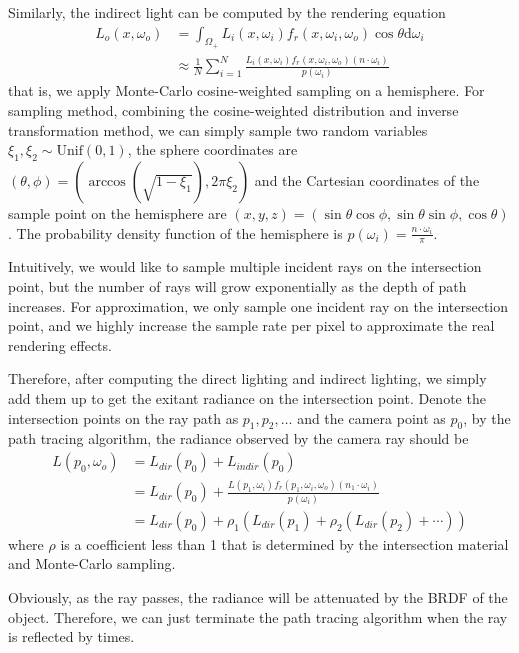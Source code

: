 \documentclass[acmtog]{acmart}
\newcommand{\code}[1]{\texttt{\color{magenta}{#1}}}
\begin{document}
Similarly, the indirect light can be computed by the rendering equation
\[
    \begin{split}
        L_o(x,\omega_o)&=\int_{\Omega_+}L_i(x,\omega_i)f_r(x,\omega_i,\omega_o)\cos\theta\mathrm{d}\omega_i\\
        &\approx\frac{1}{N}\sum_{i=1}^N\frac{L_i(x,\omega_i)f_r(x,\omega_i,\omega_o)(n\cdot\omega_i)}{p(\omega_i)}
    \end{split}
\]
that is, we apply Monte-Carlo cosine-weighted sampling on a hemisphere. For sampling method, combining the cosine-weighted distribution and inverse transformation method, we can simply sample two random variables $\xi_1,\xi_2\sim\mathrm{Unif}(0,1)$, the sphere coordinates are $(\theta,\phi)=(\arccos(\sqrt{1-\xi_1}),2\pi\xi_2)$ and the Cartesian coordinates of the sample point on the hemisphere are $(x,y,z)=(\sin\theta\cos\phi,\sin\theta\sin\phi,\cos\theta)$. The probability density function of the hemisphere is $p(\omega_i)=\frac{n\cdot\omega_i}{\pi}$.

Intuitively, we would like to sample multiple incident rays on the intersection point, but the number of rays will grow exponentially as the depth of path increases. For approximation, we only sample one incident ray on the intersection point, and we highly increase the sample rate per pixel to approximate the real rendering effects.

Therefore, after computing the direct lighting and indirect lighting, we simply add them up to get the exitant radiance on the intersection point. Denote the intersection points on the ray path as $p_1,p_2,\ldots$ and the camera point as $p_0$, by the path tracing algorithm, the radiance observed by the camera ray should be
\[
    \begin{split}
        L(p_0,\omega_o)&=L_{dir}(p_0)+L_{indir}(p_0)\\
        &=L_{dir}(p_0)+\frac{L(p_1,\omega_i)f_r(p_1,\omega_i,\omega_o)(n_1\cdot\omega_i)}{p(\omega_i)}\\
        &=L_{dir}(p_0)+\rho_1(L_{dir}(p_1)+\rho_2(L_{dir}(p_2)+\cdots))
    \end{split}
\]
where $\rho$ is a coefficient less than 1 that is determined by the intersection material and Monte-Carlo sampling.

Obviously, as the ray passes, the radiance will be attenuated by the BRDF of the object. Therefore, we can just terminate the path tracing algorithm when the ray is reflected by \code{max\_depth} times.
\end{document}
